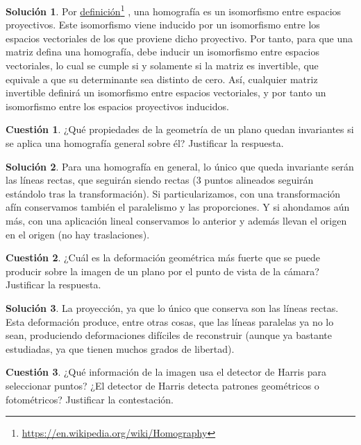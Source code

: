 \documentclass[a4paper, 11pt]{article}
\newcommand\fnurl[2]{%
  \href{#2}{#1}\footnote{\url{#2}}%
}
\theoremstyle{definition}
\newtheorem{cuestion}{Cuestión}
\newtheorem*{solucion}{Solución}
\begin{document}
  \begin{solucion}
      Por \fnurl{definición}{https://en.wikipedia.org/wiki/Homography}, una homografía
      es un isomorfismo entre espacios proyectivos. Este isomorfismo viene inducido
      por un isomorfismo entre los espacios vectoriales de los que proviene dicho proyectivo.
      Por tanto, para que una matriz defina una homografía, debe inducir un isomorfismo
      entre espacios vectoriales, lo cual se cumple si y solamente si la matriz es invertible,
      que equivale a que su determinante sea distinto de cero. Así, cualquier matriz invertible
      definirá un isomorfismo entre espacios vectoriales, y por tanto un isomorfismo entre
      los espacios proyectivos inducidos.
  \end{solucion}

  \begin{cuestion}
    ¿Qué propiedades de la geometría de un plano quedan invariantes si se aplica
    una homografía general sobre él? Justificar la respuesta.
  \end{cuestion}

  \begin{solucion}
    Para una homografía en general, lo único que queda invariante serán las líneas
    rectas, que seguirán siendo rectas (3 puntos alineados seguirán estándolo tras la transformación).
    Si particularizamos, con una transformación afín conservamos también el paralelismo y las proporciones. Y si ahondamos aún más, con
    una aplicación lineal conservamos lo anterior y además llevan el origen en el origen
    (no hay traslaciones).
  \end{solucion}

  \begin{cuestion}
    ¿Cuál es la deformación geométrica más fuerte que se puede producir sobre
    la imagen de un plano por el punto de vista de la cámara? Justificar la respuesta.
  \end{cuestion}

  \begin{solucion}
    La proyección, ya que lo único que conserva son las líneas rectas. Esta deformación
    produce, entre otras cosas, que las líneas paralelas ya no lo sean, produciendo
    deformaciones difíciles de reconstruir (aunque ya bastante estudiadas, ya que tienen muchos
    grados de libertad).
  \end{solucion}


  \begin{cuestion}
    ¿Qué información de la imagen usa el detector de Harris para seleccionar
    puntos? ¿El detector de Harris detecta patrones geométricos o fotométricos?
    Justificar la contestación.
  \end{cuestion}
\end{document}
